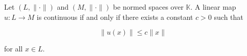 Let $(L, \|\cdot\|)$ and $(M, \|\cdot\|)$ be normed spaces over $\mathbb{K}$. A linear map $u: L \to M$ is continuous if and only if there exists a constant $c > 0$ such that

$$\|u(x)\| \leq c \|x\|$$

for all $x \in L$.
